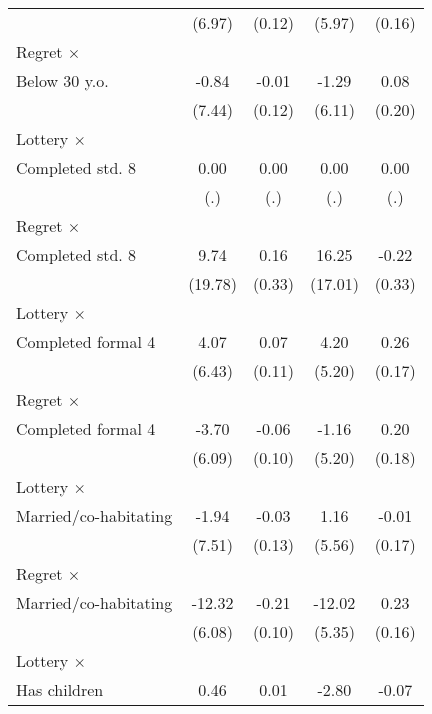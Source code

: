 \begin{table}[htbp]
\begin{tabular}{l*{4}{c}}
                &   (6.97)         &   (0.12)         &   (5.97)         &   (0.16)         \\
\addlinespace
Regret $\times$ \\ Below 30 y.o.&    -0.84         &    -0.01         &    -1.29         &     0.08         \\
                &   (7.44)         &   (0.12)         &   (6.11)         &   (0.20)         \\
\addlinespace
Lottery $\times$ \\ Completed std. 8&     0.00         &     0.00         &     0.00         &     0.00         \\
                &      (.)         &      (.)         &      (.)         &      (.)         \\
\addlinespace
Regret $\times$ \\ Completed std. 8&     9.74         &     0.16         &    16.25         &    -0.22         \\
                &  (19.78)         &   (0.33)         &  (17.01)         &   (0.33)         \\
\addlinespace
Lottery $\times$ \\ Completed formal 4&     4.07         &     0.07         &     4.20         &     0.26         \\
                &   (6.43)         &   (0.11)         &   (5.20)         &   (0.17)         \\
\addlinespace
Regret $\times$ \\ Completed formal 4&    -3.70         &    -0.06         &    -1.16         &     0.20         \\
                &   (6.09)         &   (0.10)         &   (5.20)         &   (0.18)         \\
\addlinespace
Lottery $\times$ \\ Married/co-habitating&    -1.94         &    -0.03         &     1.16         &    -0.01         \\
                &   (7.51)         &   (0.13)         &   (5.56)         &   (0.17)         \\
\addlinespace
Regret $\times$ \\ Married/co-habitating&   -12.32\sym{**} &    -0.21\sym{**} &   -12.02\sym{**} &     0.23         \\
                &   (6.08)         &   (0.10)         &   (5.35)         &   (0.16)         \\
\addlinespace
Lottery $\times$ \\ Has children&     0.46         &     0.01         &    -2.80         &    -0.07         \\

\end{tabular}
\end{table}
